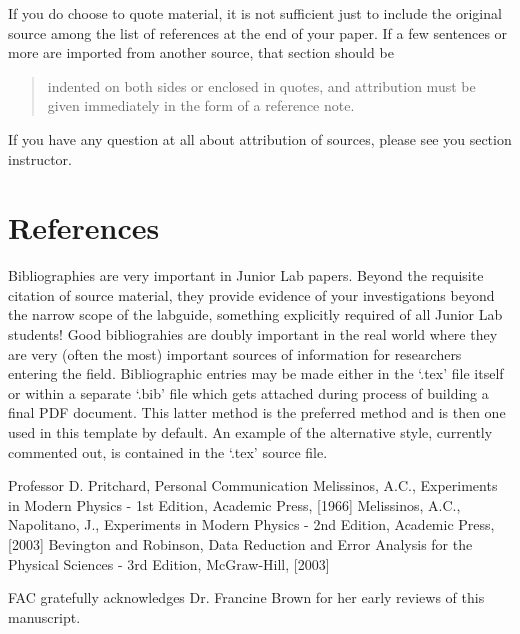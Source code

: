\documentclass[aps,twocolumn,secnumarabic,nobalancelastpage,amsmath,amssymb,nofootinbib]{revtex4}
\begin{document}
If you do choose to quote material, it is not sufficient just to
include the original source among the list of references at the end of
your paper. If a few sentences or more are imported from another
source, that section should be

\begin{quote}indented on both sides or enclosed in
quotes, and attribution must be given immediately in the form of a
reference note.\cite{melissinos2003}
\end{quote}

If you have any question at all about attribution of sources, please
see you section instructor.

\vspace{12pt}
\section{References}

Bibliographies are very important in Junior Lab papers.  Beyond the
requisite citation of source material, they provide evidence of your
investigations beyond the narrow scope of the labguide, something
explicitly required of all Junior Lab students!  Good bibliograhies
are doubly important in the real world where they are very (often
the most) important sources of information for researchers entering
the field.  Bibliographic entries may be made either in the `.tex'
file itself or within a separate `.bib' file which gets attached
during process of building a final PDF document.  This latter method
is the preferred method and is then one used in this template by
default.  An example of the alternative style, currently commented
out,  is contained in the `.tex' source file.





\begin{thebibliography}{99}
Professor D. Pritchard, Personal Communication
Melissinos, A.C., Experiments in Modern
  Physics - 1st Edition, Academic Press,  [1966]
Melissinos, A.C., Napolitano, J.,  Experiments in Modern
  Physics - 2nd Edition, Academic Press,  [2003]
Bevington and Robinson, Data Reduction and
  Error Analysis for the Physical Sciences - 3rd Edition, McGraw-Hill,
  [2003]

\end{thebibliography}


\begin{acknowledgments} FAC gratefully acknowledges Dr. Francine Brown for
her early reviews of this manuscript.
\end{acknowledgments}

\end{document}

